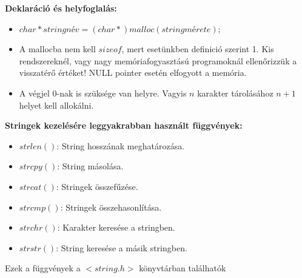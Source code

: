 \documentclass[11pt,a4paper]{article}
\begin{document}
            \begin{tcolorbox}[colback=blue!5!white,colframe=blue!50!black,title= 61. Ismertesse a string tárolás C nyelvű megvalósítást{,} valamint a stringek kezelésére leggyakrabban használt függvényeket!]
            \textbf{Deklaráció és helyfoglalás:}    
                \begin{itemize}
                    \item \(char*stringnév = (char*)malloc(string mérete);\)
                    \item A mallocba nem kell \(sizeof\), mert esetünkben definició szerint 1. Kis rendszereknél, vagy nagy memóriafogyasztású programoknál ellenőrizzük a visszatérő értéket! NULL pointer esetén elfogyott a memória.
                    \item A végjel 0-nak is szüksége van helyre. Vagyis \(n\) karakter tárolásához \(n+1\) helyet kell allokálni.
                \end{itemize}
            \textbf{Stringek kezelésére leggyakrabban használt függvények:}
            \begin{itemize}
                \item \(strlen()\): String hosszának meghatározása.
                \item \(strcpy()\): String másolása.
                \item \(strcat()\): Stringek összefűzése.
                \item \(strcmp()\): Stringek összehasonlítása.
                \item \(strchr()\): Karakter keresése a stringben.
                \item \(strstr()\): String keresése a másik stringben.
            \end{itemize}
            Ezek a függvények a \(<string.h>\) könyvtárban találhatók
            \end{tcolorbox}
            
\end{document}
